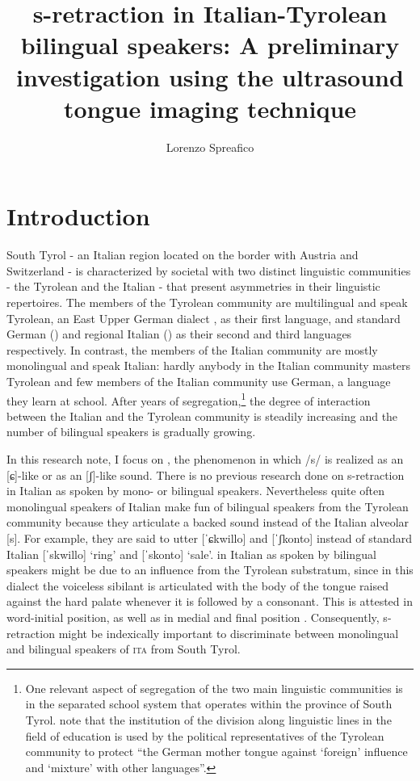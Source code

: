 \documentclass[output=paper]{LSP/langsci}
\author{Lorenzo Spreafico\affiliation{Free University of Bozen-Bolzano}}
\title{s-retraction in Italian-Tyrolean bilingual speakers: A preliminary investigation using the ultrasound tongue imaging technique}
\begin{document}
  
\section{Introduction}
South Tyrol - an Italian region located on the border with Austria and Switzerland - is characterized by societal  with two distinct linguistic communities - the Tyrolean and the Italian - that present asymmetries in their linguistic repertoires. The members of the Tyrolean community are multilingual and speak Tyrolean, an East {Upper German} dialect \citep{wiesinger_einteilung_1983,russ_central_1990}, as their first language, and standard German (\citealt{ciccolone_lo_2010}) and regional Italian (\citealt{mioni_litaliano_2001}) as their second and third languages respectively. In contrast, the members of the Italian community are mostly monolingual and speak Italian: hardly anybody in the Italian community masters Tyrolean and few members of the Italian community use German, a language they learn at school. After years of segregation,\footnote{One relevant aspect of segregation of the two main linguistic communities is in the separated school system that operates within the province of South Tyrol. \citet[237]{woelk_educational_2008} note that the institution of the division along linguistic lines in the field of education is used by the political representatives of the Tyrolean community to protect “the German mother tongue against `foreign' influence and `mixture' with other languages”.} the degree of interaction between the Italian and the Tyrolean community is steadily increasing and the number of bilingual speakers is gradually growing.

In this research note, I focus on , the phenomenon in which /s/ is realized as an [ɕ]-like or as an [ʃ]-like sound. There is no previous research done on s-retraction in Italian as spoken by mono- or bilingual speakers. Nevertheless quite often monolingual speakers of Italian make fun of bilingual speakers from the Tyrolean community because they articulate a backed sound instead of the Italian alveolar [s]. For example, they are said to utter [ˈɕkwillo] and [ˈʃkonto] instead of standard Italian [ˈskwillo] `ring' and [ˈskonto] `sale'.  in Italian as spoken by bilingual speakers might be due to an influence from the Tyrolean substratum, since in this dialect the voiceless sibilant is articulated with the body of the tongue raised against the hard palate whenever it is followed by a consonant. This is attested in word-initial position, as well as in medial and final position \citep{alber_regional_2001,alber_silbenonset_2005}. Consequently, s-retraction might be indexically important to discriminate between monolingual and bilingual speakers of \textsc{ita} from South Tyrol.
\end{document}
